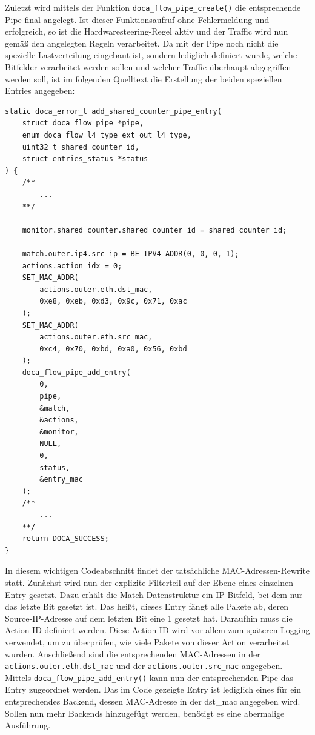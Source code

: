 Zuletzt wird mittels der Funktion \texttt{doca\_flow\_pipe\_create()} die entsprechende Pipe final angelegt. Ist dieser Funktionsaufruf ohne Fehlermeldung und erfolgreich, so ist die Hardwaresteering-Regel aktiv und der Traffic wird nun gemäß den angelegten Regeln verarbeitet.
\newline Da mit der Pipe noch nicht die spezielle Lastverteilung eingebaut ist, sondern lediglich definiert wurde, welche Bitfelder verarbeitet werden sollen und welcher Traffic überhaupt abgegriffen werden soll, ist im folgenden Quelltext die Erstellung der beiden speziellen Entries angegeben:
\begin{verbatim}
static doca_error_t add_shared_counter_pipe_entry(
    struct doca_flow_pipe *pipe,
    enum doca_flow_l4_type_ext out_l4_type,
    uint32_t shared_counter_id,
    struct entries_status *status
) {
    /**
        ...
    **/
    
    monitor.shared_counter.shared_counter_id = shared_counter_id;
    
    match.outer.ip4.src_ip = BE_IPV4_ADDR(0, 0, 0, 1);	
    actions.action_idx = 0;
    SET_MAC_ADDR(
        actions.outer.eth.dst_mac, 
        0xe8, 0xeb, 0xd3, 0x9c, 0x71, 0xac
    );
    SET_MAC_ADDR(
        actions.outer.eth.src_mac, 
        0xc4, 0x70, 0xbd, 0xa0, 0x56, 0xbd
    );
    doca_flow_pipe_add_entry(
        0, 
        pipe, 
        &match, 
        &actions, 
        &monitor, 
        NULL, 
        0, 
        status, 
        &entry_mac
    );
    /**
        ...
    **/
    return DOCA_SUCCESS;
}
\end{verbatim}
In diesem wichtigen Codeabschnitt findet der tatsächliche MAC-Adressen-Rewrite statt. Zunächst wird nun der explizite Filterteil auf der Ebene eines einzelnen Entry gesetzt. Dazu erhält die Match-Datenstruktur ein IP-Bitfeld, bei dem nur das letzte Bit gesetzt ist. Das heißt, dieses Entry fängt alle Pakete ab, deren Source-IP-Adresse auf dem letzten Bit eine 1 gesetzt hat. Daraufhin muss die Action ID definiert werden. Diese Action ID wird vor allem zum späteren Logging verwendet, um zu überprüfen, wie viele Pakete von dieser Action verarbeitet wurden. Anschließend sind die entsprechenden MAC-Adressen in der \texttt{actions.outer.eth.dst\_mac} und der \texttt{actions.outer.src\_mac} angegeben.
Mittels \texttt{doca\_flow\_pipe\_add\_entry()} kann nun der entsprechenden Pipe das Entry zugeordnet werden. Das im Code gezeigte Entry ist lediglich eines für ein entsprechendes Backend, dessen MAC-Adresse in der dst\_mac angegeben wird. Sollen nun mehr Backends hinzugefügt werden, benötigt es eine abermalige Ausführung. 
